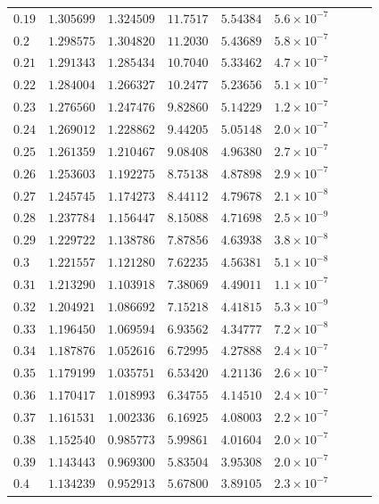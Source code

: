 \documentclass[12pt]{extarticle}
\theoremstyle{plain}
\theoremstyle{remark}
\begin{document}
\begin{longtable}{lcccccccc}
$0.19$ & $1.305699$ & $1.324509$ & $11.7517$ & $5.54384$ & $5.6\times10^{-7}$ \\
$0.2$ & $1.298575$ & $1.304820$ & $11.2030$ & $5.43689$ & $5.8\times10^{-7}$ \\
$0.21$ & $1.291343$ & $1.285434$ & $10.7040$ & $5.33462$ & $4.7\times10^{-7}$ \\
$0.22$ & $1.284004$ & $1.266327$ & $10.2477$ & $5.23656$ & $5.1\times10^{-7}$ \\
$0.23$ & $1.276560$ & $1.247476$ & $9.82860$ & $5.14229$ & $1.2\times10^{-7}$ \\
$0.24$ & $1.269012$ & $1.228862$ & $9.44205$ & $5.05148$ & $2.0\times10^{-7}$ \\
$0.25$ & $1.261359$ & $1.210467$ & $9.08408$ & $4.96380$ & $2.7\times10^{-7}$ \\
$0.26$ & $1.253603$ & $1.192275$ & $8.75138$ & $4.87898$ & $2.9\times10^{-7}$ \\
$0.27$ & $1.245745$ & $1.174273$ & $8.44112$ & $4.79678$ & $2.1\times10^{-8}$ \\
$0.28$ & $1.237784$ & $1.156447$ & $8.15088$ & $4.71698$ & $2.5\times10^{-9}$ \\
$0.29$ & $1.229722$ & $1.138786$ & $7.87856$ & $4.63938$ & $3.8\times10^{-8}$ \\
$0.3$ & $1.221557$ & $1.121280$ & $7.62235$ & $4.56381$ & $5.1\times10^{-8}$ \\
$0.31$ & $1.213290$ & $1.103918$ & $7.38069$ & $4.49011$ & $1.1\times10^{-7}$ \\
$0.32$ & $1.204921$ & $1.086692$ & $7.15218$ & $4.41815$ & $5.3\times10^{-9}$ \\
$0.33$ & $1.196450$ & $1.069594$ & $6.93562$ & $4.34777$ & $7.2\times10^{-8}$ \\
$0.34$ & $1.187876$ & $1.052616$ & $6.72995$ & $4.27888$ & $2.4\times10^{-7}$ \\
$0.35$ & $1.179199$ & $1.035751$ & $6.53420$ & $4.21136$ & $2.6\times10^{-7}$ \\
$0.36$ & $1.170417$ & $1.018993$ & $6.34755$ & $4.14510$ & $2.4\times10^{-7}$ \\
$0.37$ & $1.161531$ & $1.002336$ & $6.16925$ & $4.08003$ & $2.2\times10^{-7}$ \\
$0.38$ & $1.152540$ & $0.985773$ & $5.99861$ & $4.01604$ & $2.0\times10^{-7}$ \\
$0.39$ & $1.143443$ & $0.969300$ & $5.83504$ & $3.95308$ & $2.0\times10^{-7}$ \\
$0.4$ & $1.134239$ & $0.952913$ & $5.67800$ & $3.89105$ & $2.3\times10^{-7}$ \\

\end{longtable}
\end{document}
